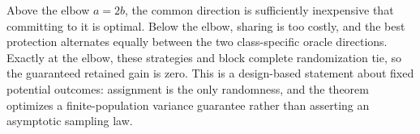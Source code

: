 Above the elbow \(a=2b\), the common direction is sufficiently inexpensive that committing to it is optimal. Below the elbow, sharing is too costly, and the best protection alternates equally between the two class-specific oracle directions. Exactly at the elbow, these strategies and block complete randomization tie, so the guaranteed retained gain is zero. This is a design-based statement about fixed potential outcomes: assignment is the only randomness, and the theorem optimizes a finite-population variance guarantee rather than asserting an asymptotic sampling law.